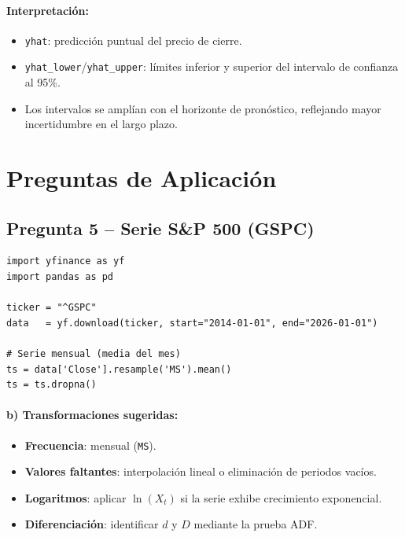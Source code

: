 \documentclass[12pt, a4paper]{article}
\begin{document}
\paragraph{Interpretación:}
\begin{itemize}
  \item \texttt{yhat}: predicción puntual del precio de cierre.
  \item \texttt{yhat\_lower}/\texttt{yhat\_upper}: límites inferior y superior
        del intervalo de confianza al 95\%.
  \item Los intervalos se amplían con el horizonte de pronóstico, reflejando
        mayor incertidumbre en el largo plazo.
\end{itemize}

\section{Preguntas de Aplicación}

\subsection{Pregunta 5 -- Serie S\&P 500 (GSPC)}

\begin{lstlisting}
import yfinance as yf
import pandas as pd

ticker = "^GSPC"
data   = yf.download(ticker, start="2014-01-01", end="2026-01-01")

# Serie mensual (media del mes)
ts = data['Close'].resample('MS').mean()
ts = ts.dropna()
\end{lstlisting}

\paragraph{b) Transformaciones sugeridas:}
\begin{itemize}
  \item \textbf{Frecuencia}: mensual (\texttt{MS}).
  \item \textbf{Valores faltantes}: interpolación lineal o eliminación de
        periodos vacíos.
  \item \textbf{Logaritmos}: aplicar $\ln(X_t)$ si la serie exhibe crecimiento
        exponencial.
  \item \textbf{Diferenciación}: identificar $d$ y $D$ mediante la prueba ADF.
\end{itemize}
\end{document}
